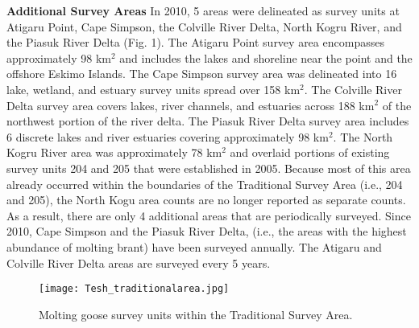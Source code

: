 \documentclass[]{article}
\begin{document}
\textbf{Additional Survey Areas}\hfill\break
In 2010, 5 areas were delineated as survey units at Atigaru Point, Cape
Simpson, the Colville River Delta, North Kogru River, and the Piasuk
River Delta (Fig. 1). The Atigaru Point survey area encompasses
approximately 98 km\(^{2}\) and includes the lakes and shoreline near
the point and the offshore Eskimo Islands. The Cape Simpson survey area
was delineated into 16 lake, wetland, and estuary survey units spread
over 158 km\(^{2}\). The Colville River Delta survey area covers lakes,
river channels, and estuaries across 188 km\(^{2}\) of the northwest
portion of the river delta. The Piasuk River Delta survey area includes
6 discrete lakes and river estuaries covering approximately 98
km\(^{2}\). The North Kogru River area was approximately 78 km\(^{2}\)
and overlaid portions of existing survey units 204 and 205 that were
established in 2005. Because most of this area already occurred within
the boundaries of the Traditional Survey Area (i.e., 204 and 205), the
North Kogu area counts are no longer reported as separate counts. As a
result, there are only 4 additional areas that are periodically
surveyed. Since 2010, Cape Simpson and the Piasuk River Delta, (i.e.,
the areas with the highest abundance of molting brant) have been
surveyed annually. The Atigaru and Colville River Delta areas are
surveyed every 5 years.

\begin{figure}[h]
\texttt{[image: Tesh\_traditionalarea.jpg]}
\caption{Molting goose survey units within the Traditional Survey Area.}
\end{figure}
\end{document}

